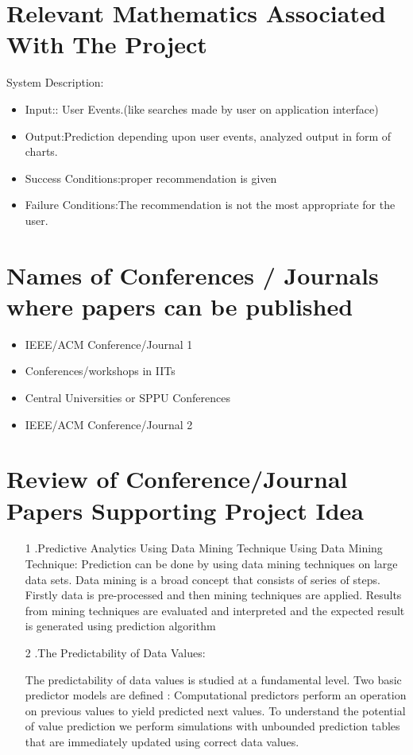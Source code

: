 \documentclass[oneside,a4paper,12pt]{book}
\begin{document}
\begin{enumerate}
	
\section{Relevant Mathematics Associated With The Project}
\label{sec:math}
System Description:
\begin{itemize} 
\item Input:: User Events.(like searches made by user on application interface) 	 
\item Output:Prediction depending upon user events, analyzed output in form of charts.	 
 

\item Success Conditions:proper recommendation is given	 	 
\item Failure Conditions:The recommendation is not the most appropriate for the user.				
\end{itemize}


\section{Names of Conferences / Journals where papers can be published}
\begin{itemize}
\item  IEEE/ACM Conference/Journal 1 
\item  Conferences/workshops in IITs
\item  Central Universities or SPPU Conferences 
\item IEEE/ACM Conference/Journal 2 
\end{itemize}


\section{Review of Conference/Journal Papers Supporting Project Idea}
\label{sec:survey}
   \begin{itemize}
   \item [1].Predictive Analytics Using Data Mining Technique Using Data Mining Technique:
Prediction can be done by using data mining techniques on large data sets. Data mining is a broad concept that consists of series of steps. Firstly data is pre-processed and then mining techniques are applied. Results from mining techniques are evaluated and interpreted and the expected result is generated using prediction algorithm 

   \item[2].The Predictability of Data Values: 

The predictability of data values is studied at a fundamental level. Two basic predictor models are defined : Computational predictors perform an operation on previous values to yield predicted next values. 
To understand the potential of value prediction we perform simulations with unbounded prediction tables that are immediately updated using correct data values. 


\end{itemize}
\end{enumerate}
\end{document}
